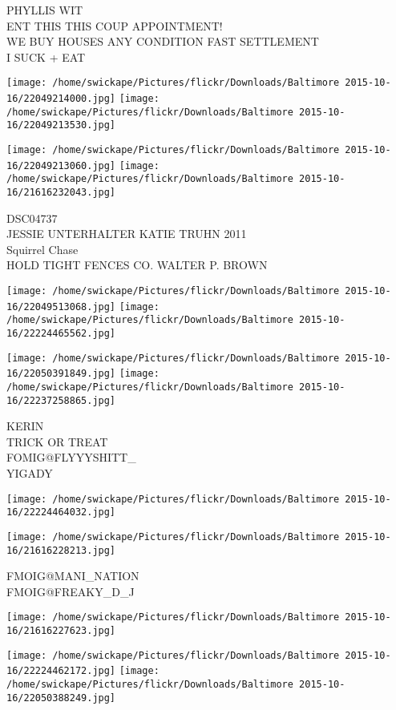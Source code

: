 \documentclass[10pt,letterpaper]{article}
\begin{document}
PHYLLIS WIT\\
ENT THIS THIS COUP APPOINTMENT!\\
WE BUY HOUSES ANY CONDITION FAST SETTLEMENT\\
I SUCK + EAT
\pagebreak

\texttt{[image: /home/swickape/Pictures/flickr/Downloads/Baltimore 2015-10-16/22049214000.jpg]}
\texttt{[image: /home/swickape/Pictures/flickr/Downloads/Baltimore 2015-10-16/22049213530.jpg]}

\texttt{[image: /home/swickape/Pictures/flickr/Downloads/Baltimore 2015-10-16/22049213060.jpg]}
\texttt{[image: /home/swickape/Pictures/flickr/Downloads/Baltimore 2015-10-16/21616232043.jpg]}

DSC04737\\
JESSIE UNTERHALTER KATIE TRUHN 2011\\
Squirrel Chase\\
HOLD TIGHT FENCES CO. WALTER P. BROWN
\pagebreak

\texttt{[image: /home/swickape/Pictures/flickr/Downloads/Baltimore 2015-10-16/22049513068.jpg]}
\texttt{[image: /home/swickape/Pictures/flickr/Downloads/Baltimore 2015-10-16/22224465562.jpg]}

\texttt{[image: /home/swickape/Pictures/flickr/Downloads/Baltimore 2015-10-16/22050391849.jpg]}
\texttt{[image: /home/swickape/Pictures/flickr/Downloads/Baltimore 2015-10-16/22237258865.jpg]}

KERIN\\
TRICK OR TREAT\\
FOMIG@FLYYYSHITT\_\\
YIGADY
\pagebreak

\texttt{[image: /home/swickape/Pictures/flickr/Downloads/Baltimore 2015-10-16/22224464032.jpg]}

\vspace{0.25in}
\texttt{[image: /home/swickape/Pictures/flickr/Downloads/Baltimore 2015-10-16/21616228213.jpg]}

FMOIG@MANI\_NATION\\
FMOIG@FREAKY\_D\_J
\pagebreak

\texttt{[image: /home/swickape/Pictures/flickr/Downloads/Baltimore 2015-10-16/21616227623.jpg]}

\vspace{0.25in}
\texttt{[image: /home/swickape/Pictures/flickr/Downloads/Baltimore 2015-10-16/22224462172.jpg]}
\texttt{[image: /home/swickape/Pictures/flickr/Downloads/Baltimore 2015-10-16/22050388249.jpg]}
\end{document}
